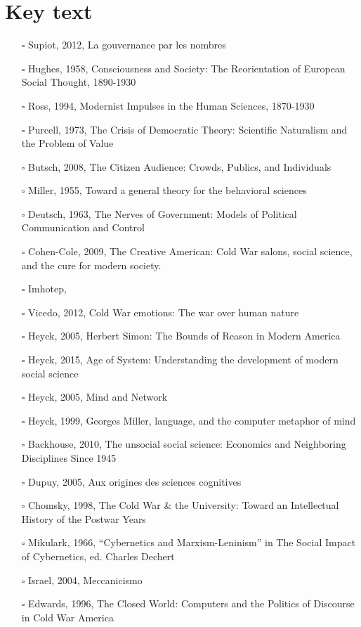 \documentclass[draft=false, paper=A4,portrait,twoside=true,twocolumn=false,headinclude=false,footinclude=false,fontsize=11,BCOR=15mm,DIV=calc,pagesize=auto,titlepage=firstiscover,mpinclude=true,headings=big,headings=twolinechapter,open=right,chapterprefix=false,headsepline=false,parskip=full]{scrbook}
\begin{document}
\section{Key text}
\label{sec:org740b6eb}
\begin{itemize}
\item[{$\square$}] Supiot, 2012, La gouvernance par les nombres
\item[{$\square$}] Hughes, 1958, Consciousness and Society: The Reorientation of European Social Thought, 1890-1930
\item[{$\square$}] Ross, 1994, Modernist Impulses in the Human Sciences, 1870-1930
\item[{$\square$}] Purcell, 1973, The Crisis of Democratic Theory: Scientific Naturalism and the Problem of Value
\item[{$\square$}] Butsch, 2008, The Citizen Audience: Crowds, Publics, and Individuals
\item[{$\square$}] Miller, 1955, Toward a general theory for the behavioral sciences
\item[{$\square$}] Deutsch, 1963, The Nerves of Government: Models of Political Communication and Control
\item[{$\square$}] Cohen-Cole, 2009, The Creative American: Cold War salons, social science, and the cure for modern society.
\item[{$\square$}] Imhotep,
\item[{$\square$}] Vicedo, 2012, Cold War emotions: The war over human nature
\item[{$\square$}] Heyck, 2005, Herbert Simon: The Bounds of Reason in Modern America
\item[{$\square$}] Heyck, 2015, Age of System: Understanding the development of modern social science
\item[{$\square$}] Heyck, 2005, Mind and Network
\item[{$\square$}] Heyck, 1999, Georges Miller, language, and the computer metaphor of mind
\item[{$\square$}] Backhouse, 2010, The unsocial social science: Economics and Neighboring Disciplines Since 1945
\item[{$\square$}] Dupuy, 2005, Aux origines des sciences cognitives
\item[{$\square$}] Chomsky, 1998, The Cold War \& the University: Toward an Intellectual History of the Postwar Years
\item[{$\square$}] Mikulark, 1966, ``Cybernetics and Marxism-Leninism'' in The Social Impact of Cybernetics, ed. Charles Dechert
\item[{$\square$}] Israel, 2004, Meccanicismo
\item[{$\square$}] Edwards, 1996, The Closed World: Computers and the Politics of Discourse in Cold War America
\end{itemize}
\end{document}
